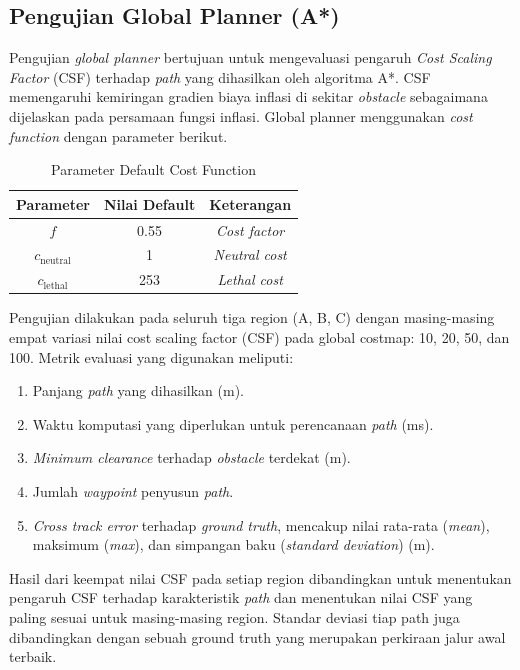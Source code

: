 \subsection{Pengujian Global Planner (A*)}

Pengujian \emph{global planner} bertujuan untuk mengevaluasi pengaruh \emph{Cost Scaling Factor} (CSF) terhadap \emph{path} yang dihasilkan oleh algoritma A*. CSF memengaruhi kemiringan gradien biaya inflasi di sekitar \emph{obstacle} sebagaimana dijelaskan pada persamaan fungsi inflasi. Global planner menggunakan \emph{cost function} dengan parameter berikut.

\begin{table}[H]
\centering
\caption{Parameter Default Cost Function}
\label{tab:cost_defaults}
\begin{tabular}{ccc}
\toprule
\textbf{Parameter} & \textbf{Nilai Default} & \textbf{Keterangan} \\
\midrule
$f$          & 0.55   & \emph{Cost factor} \\
$c_{\text{neutral}}$ & 1 & \emph{Neutral cost} \\
$c_{\text{lethal}}$  & 253 & \emph{Lethal cost} \\
\bottomrule
\end{tabular}
\end{table}

Pengujian dilakukan pada seluruh tiga region (A, B, C) dengan masing-masing empat variasi nilai cost scaling factor (CSF) pada global costmap: 10, 20, 50, dan 100. Metrik evaluasi yang digunakan meliputi:

\begin{enumerate}
    \item Panjang \emph{path} yang dihasilkan (m).
    \item Waktu komputasi yang diperlukan untuk perencanaan \emph{path} (ms).
    \item \emph{Minimum clearance} terhadap \emph{obstacle} terdekat (m).
    \item Jumlah \emph{waypoint} penyusun \emph{path}.
    \item \emph{Cross track error} terhadap \emph{ground truth}, mencakup nilai rata-rata (\emph{mean}), maksimum (\emph{max}), dan simpangan baku (\emph{standard deviation}) (m).
\end{enumerate}

Hasil dari keempat nilai CSF pada setiap region dibandingkan untuk menentukan pengaruh CSF terhadap karakteristik \emph{path} dan menentukan nilai CSF yang paling sesuai untuk masing-masing region. Standar deviasi tiap path juga dibandingkan dengan sebuah ground truth yang merupakan perkiraan jalur awal terbaik.

